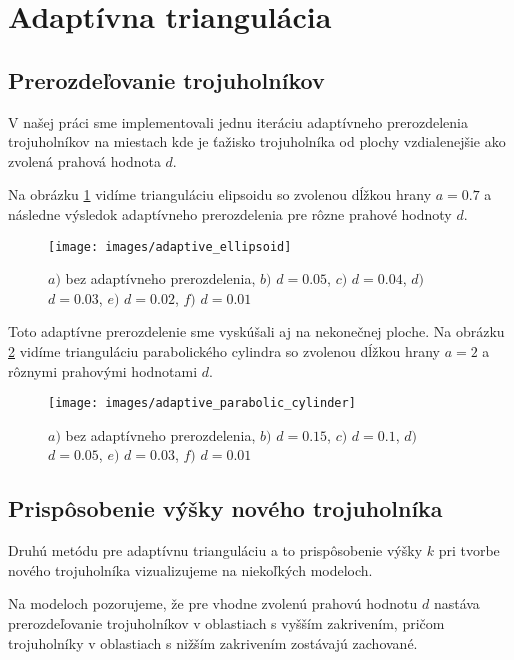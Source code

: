 \section{Adaptívna triangulácia}
\subsection{Prerozdeľovanie trojuholníkov}

V našej práci sme implementovali jednu iteráciu adaptívneho prerozdelenia trojuholníkov
na miestach kde je ťažisko trojuholníka od plochy vzdialenejšie ako zvolená prahová hodnota $d$.

Na obrázku \ref{obr:adaptive_ellipsoid} vidíme trianguláciu elipsoidu so zvolenou dĺžkou hrany $a=0.7$
a následne výsledok adaptívneho prerozdelenia pre rôzne prahové hodnoty $d$.

\begin{figure}
    \centerline{\texttt{[image: images/adaptive\_ellipsoid]}}
    \caption[Adaptívne prerozdelenie elipsoidu.]
    {$a)$ bez adaptívneho prerozdelenia, $b)$ $d=0.05$, $c)$ $d=0.04$, $d)$ $d=0.03$, $e)$ $d=0.02$, $f)$ $d=0.01$}
    \label{obr:adaptive_ellipsoid}
\end{figure}


Toto adaptívne prerozdelenie sme vyskúšali aj na nekonečnej ploche.
Na obrázku \ref{obr:adaptive_parabolic_cylinder} vidíme trianguláciu parabolického 
cylindra so zvolenou dĺžkou hrany $a=2$ a rôznymi prahovými hodnotami $d$.

\begin{figure}
    \centerline{\texttt{[image: images/adaptive\_parabolic\_cylinder]}}
    \caption[Adaptívne prerozdelenie parabolického cylindra.]
    {$a)$ bez adaptívneho prerozdelenia, $b)$ $d=0.15$, $c)$ $d=0.1$, $d)$ $d=0.05$, $e)$ $d=0.03$, $f)$ $d=0.01$}
    \label{obr:adaptive_parabolic_cylinder}
\end{figure}

\subsection{Prispôsobenie výšky nového trojuholníka}
Druhú metódu pre adaptívnu trianguláciu a to prispôsobenie výšky $k$ pri tvorbe nového trojuholníka 
vizualizujeme na niekoľkých modeloch.

Na modeloch pozorujeme, že pre vhodne zvolenú prahovú hodnotu $d$ nastáva prerozdeľovanie 
trojuholníkov v oblastiach s vyšším zakrivením, pričom trojuholníky v oblastiach s nižším zakrivením 
zostávajú zachované.

